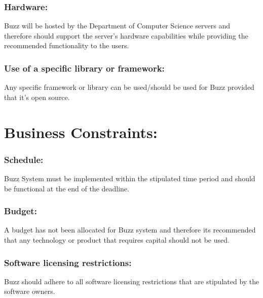 \documentclass[11pt]{article}
\begin{document}
			\subsubsection{Hardware:}
			
			
			\textbf{}Buzz will be hosted by the Department of Computer Science servers and therefore should support the server’s hardware capabilities while providing the recommended functionality to the users.
			
			\subsubsection{Use of a specific library or framework:}
			
			
			\textbf{}Any specific framework or library can be used/should be used for Buzz provided that it’s open source.
	
			\section{ Business Constraints:}
				\subsubsection{Schedule:}
				
				
				\textbf{}Buzz System must be implemented within the stipulated time period and should be functional at the end of the deadline.
					\subsubsection{Budget:}
					
					
					\textbf{}A budget has not been allocated for Buzz system and therefore its recommended that any technology or product that requires capital should not be used.
						\subsubsection{Software licensing restrictions:}
						
						
						\textbf{}Buzz should adhere to all software licensing restrictions that are stipulated by the software owners.
\end{document}
